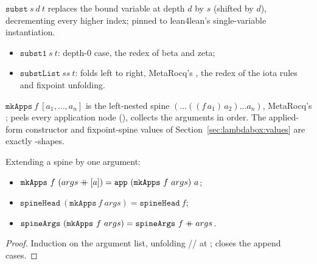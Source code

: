 \begin{definition}[Substitution]
\label{def:LBTerm-subst}
\leanok
{}
 $\mathtt{subst}\ s\ d\ t$ replaces the bound variable at depth $d$ by $s$ (shifted by $d$), decrementing every higher index; pinned to lean4lean's single-variable instantiation.
\begin{itemize}
\item $\mathtt{subst1}\ s\ t$: depth-$0$ case, the redex of beta and zeta;
\item $\mathtt{substList}\ ss\ t$: folds  left to right, MetaRocq's , the redex of the iota rules and fixpoint unfolding.
\end{itemize}
\end{definition}

\begin{definition}
\label{def:LBTerm-mkApps}
\leanok
{}
 $\mathtt{mkApps}\ f\ [a_1,\dots,a_n]$ is the left-nested spine $(\dots((f\,a_1)\,a_2)\dots a_n)$, MetaRocq's ;  peels every application node (),  collects the arguments in order.
 The applied-form constructor and fixpoint-spine values of Section~\ref{sec:lambdabox:values} are exactly -shapes.
\end{definition}

\begin{lemma}
\label{lem:LBTerm-mkApps_concat}
\leanok
{}
 Extending a spine by one argument:
\begin{itemize}
\item $\mathtt{mkApps}\ f\ (args \mathbin{+\mkern-10mu+} [a]) = \mathtt{app}\ (\mathtt{mkApps}\ f\ args)\ a$;
\item $\mathtt{spineHead}\ (\mathtt{mkApps}\ f\ args) = \mathtt{spineHead}\ f$;
\item $\mathtt{spineArgs}\ (\mathtt{mkApps}\ f\ args) = \mathtt{spineArgs}\ f \mathbin{+\mkern-10mu+} args$.
\end{itemize}
\end{lemma}
\begin{proof}
\leanok
{}
 Induction on the argument list, unfolding // at ;  closes the append cases.
\end{proof}

